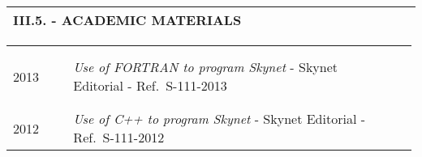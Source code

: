 \documentclass[11pt, letterpaper]{extarticle}
\begin{document}

	\label{sec:III.5.}
	\begin{longtable}{C{1.012\linewidth}N}
		\textbf{\large III.5. - ACADEMIC MATERIALS} & \\[0.70cm] \hline
	\end{longtable}

	\begin{longtable}{C{0.154\linewidth}C{0.834\linewidth}N}
		                                                             &                                                                                                                                                                                                                                                  & \\[-0.25cm]
		                                                             &                                                                                                                                                                                                                                                  & \\[-0.25cm]
		2013                                                         & \textit{Use of FORTRAN to program Skynet} - Skynet Editorial - Ref.~S-111-2013                                                                                                                                                                   & \\
		                                                             &                                                                                                                                                                                                                                                  & \\[-0.25cm] \hline
		                                                             &                                                                                                                                                                                                                                                  & \\[-0.25cm]
		2012                                                         & \textit{Use of C++ to program Skynet} - Skynet Editorial - Ref.~S-111-2012                                                                                                                                                                       & \\

\end{longtable}
\end{document}
